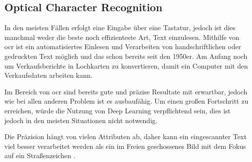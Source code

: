 \subsection{Optical Character Recognition}

In den meisten Fällen erfolgt eine Eingabe über eine Tastatur, jedoch ist dies manchmal weder die beste noch effizienteste Art, Text einzulesen. Mithilfe von \gls{ocr} ist ein automatisiertes Einlesen und Verarbeiten von handschriftlichen oder gedruckten Text möglich und das schon bereits seit den 1950er. Am Anfang noch um Verkaufsberichte in Lochkarten zu konvertieren, damit ein Computer mit den Verkaufsdaten arbeiten kann. \cite{OCR:online}

Im Bereich von \gls{ocr} sind bereits gute und präzise Resultate mit  erwartbar, jedoch wie bei allen anderen Problem ist es ausbaufähig. Um einen großen Fortschritt zu erreichen, würde die Nutzung von Deep Learning verpflichtend sein, dies ist jedoch in den meisten Situationen nicht notwendig.

Die Präzision hängt von vielen Attributen ab, daher kann ein eingescannter Text viel besser verarbeitet werden als ein im Freien geschossenes Bild mit dem Fokus auf ein Straßenzeichen \cite{OCR2:online}.

